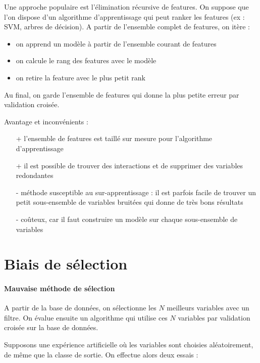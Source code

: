 Une approche populaire est l'élimination récursive de features. On suppose que l'on dispose d'un algorithme d'apprentissage qui peut ranker les features (ex : SVM, arbres de décision). A partir de l'ensemble complet de features, on itère :

\begin{itemize}
	\item on apprend un modèle à partir de l'ensemble courant de features
	\item on calcule le rang des features avec le modèle
	\item on retire la feature avec le plus petit rank
\end{itemize}

Au final, on garde l'ensemble de features qui donne la plus petite erreur par validation croisée.


Avantage et inconvénients :

\begin{itemize}
	\item[+] l'ensemble de features est taillé sur mesure pour l'algorithme d'apprentissage
	\item[+] il est possible de trouver des interactions et de supprimer des variables redondantes
	\item[-] méthode susceptible au sur-apprentissage : il est parfois facile de trouver un petit sous-ensemble de variables bruitées qui donne de très bons résultats
	\item[-] coûteux, car il faut construire un modèle sur chaque sous-ensemble de variables
\end{itemize}


\section{Biais de sélection}

\paragraph{Mauvaise méthode de sélection}

A partir de la base de données, on sélectionne les $N$ meilleurs variables avec un filtre. On évalue ensuite un algorithme qui utilise ces $N$ variables par validation croisée sur la base de données.

Supposons une expérience artificielle où les variables sont choisies aléatoirement, de même que la classe de sortie. On effectue alors deux essais :

